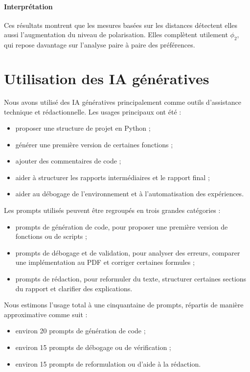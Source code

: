 \documentclass[11pt,a4paper]{article}
\begin{document}
\paragraph{Interpr\'etation}
Ces r\'esultats montrent que les mesures bas\'ees sur les distances d\'etectent elles aussi l'augmentation du niveau de polarisation. Elles compl\`etent utilement \(\phi_2\), qui repose davantage sur l'analyse paire \`a paire des pr\'ef\'erences.

\section{Utilisation des IA g\'en\'eratives}

Nous avons utilis\'e des IA g\'en\'eratives principalement comme outils d'assistance technique et r\'edactionnelle. Les usages principaux ont \'et\'e :
\begin{itemize}[leftmargin=*]
    \item proposer une structure de projet en Python ;
    \item g\'en\'erer une premi\`ere version de certaines fonctions ;
    \item ajouter des commentaires de code ;
    \item aider \`a structurer les rapports interm\'ediaires et le rapport final ;
    \item aider au d\'ebogage de l'environnement et \`a l'automatisation des exp\'eriences.
\end{itemize}

Les prompts utilis\'es peuvent \^etre regroup\'es en trois grandes cat\'egories :
\begin{itemize}[leftmargin=*]
    \item prompts de g\'en\'eration de code, pour proposer une premi\`ere version de fonctions ou de scripts ;
    \item prompts de d\'ebogage et de validation, pour analyser des erreurs, comparer une impl\'ementation au PDF et corriger certaines formules ;
    \item prompts de r\'edaction, pour reformuler du texte, structurer certaines sections du rapport et clarifier des explications.
\end{itemize}

Nous estimons l'usage total \`a une cinquantaine de prompts, r\'epartis de mani\`ere approximative comme suit :
\begin{itemize}[leftmargin=*]
    \item environ 20 prompts de g\'en\'eration de code ;
    \item environ 15 prompts de d\'ebogage ou de v\'erification ;
    \item environ 15 prompts de reformulation ou d'aide \`a la r\'edaction.
\end{itemize}
\end{document}
